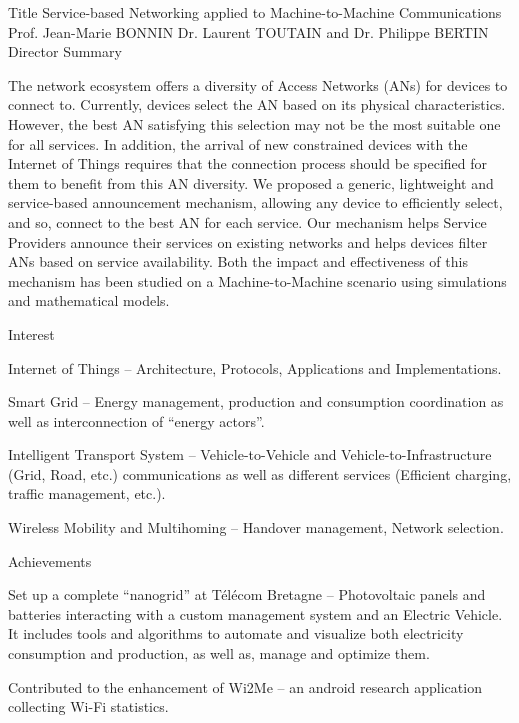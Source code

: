 \begin{cvhonors}
  \cvhonortwo
    {Title}
    {Service-based Networking applied to Machine-to-Machine Communications}
  \cvhonor
    {Prof. Jean-Marie BONNIN}
    {Dr. Laurent TOUTAIN and Dr. Philippe BERTIN}
    {}
    {Director}
  \cventryshort
    {Summary}
    {\begin{justify}
    \quad The network ecosystem offers a diversity of Access Networks (ANs) for devices to connect to. Currently, devices select the AN based on its physical characteristics. However, the best AN satisfying this selection may not be the most suitable one for all services. In addition, the arrival of new constrained devices with the Internet of Things requires that the connection process should be specified for them to benefit from this AN diversity. We proposed a generic, lightweight and service-based announcement mechanism, allowing any device to efficiently select, and so, connect to the best AN for each service. Our mechanism helps Service Providers announce their services on existing networks and helps devices filter ANs based on service availability. Both the impact and effectiveness of this mechanism has been studied on a Machine-to-Machine scenario using simulations and mathematical models.
    \end{justify}}


  \cventryshort   
    {Interest}
    {\begin{cvitems}
        \item {Internet of Things -- Architecture, Protocols, Applications and Implementations.}
        \item {Smart Grid -- Energy management, production and consumption coordination as well as interconnection of ``energy actors''.}
        \item {Intelligent Transport System -- Vehicle-to-Vehicle and Vehicle-to-Infrastructure (Grid, Road, etc.) communications as well as different services (Efficient charging, traffic management, etc.).}
        \item {Wireless Mobility and Multihoming -- Handover management, Network selection.}
      \end{cvitems}
      }
  \cventryshort
    {Achievements}
    {\begin{cvitems}
        \item {Set up a complete ``nanogrid'' at T\'{e}l\'{e}com Bretagne -- Photovoltaic panels and batteries interacting with a custom management system and an Electric Vehicle. It includes tools and algorithms to automate and visualize both electricity consumption and production, as well as, manage and optimize them.}
        \item {Contributed to the enhancement of Wi2Me – an android research application collecting Wi-Fi statistics.}
      \end{cvitems}
      }


\end{cvhonors}
